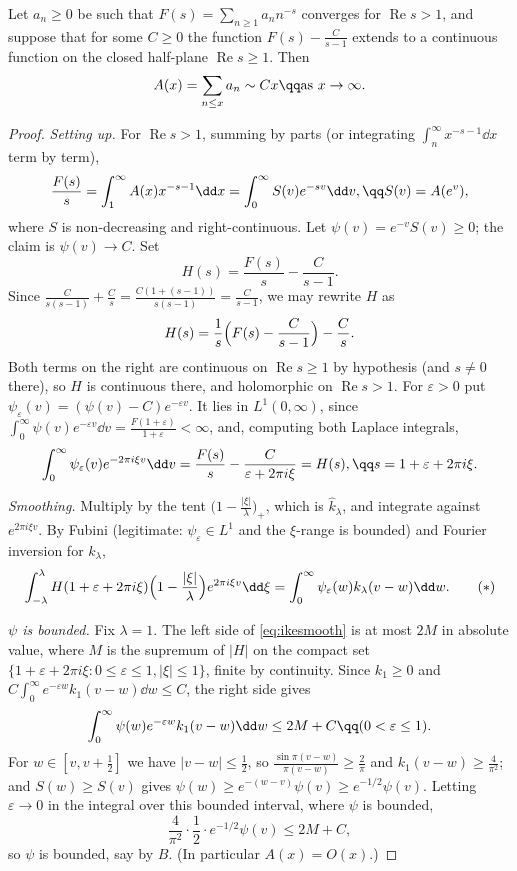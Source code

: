 \begin{theorem}\label{thm:ikehara}
Let $a_n\ge0$ be such that $F(s)=\sum_{n\ge1}a_nn^{-s}$ converges for $\operatorname{Re}s>1$, and suppose that for some $C\ge0$ the function
$F(s)-\frac C{s-1}$ extends to a continuous function on the closed half-plane $\operatorname{Re}s\ge1$. Then
\[
A(x)=\sum_{n\le x}a_n\sim Cx\qq\text{as }x\to\infty.
\]
\end{theorem}
\begin{proof}
\emph{Setting up.} For $\operatorname{Re}s>1$, summing by parts (or integrating $\int_n^\infty x^{-s-1}\dd x$ term by term),
\[
\frac{F(s)}s=\int_1^\infty A(x)x^{-s-1}\dd x=\int_0^\infty S(v)e^{-sv}\dd v,\qq S(v)=A(e^v),
\]
where $S$ is non-decreasing and right-continuous. Let $\psi(v)=e^{-v}S(v)\ge0$; the claim is $\psi(v)\to C$. Set
\[
H(s)=\frac{F(s)}s-\frac C{s-1}.
\]
Since $\frac C{s(s-1)}+\frac Cs=\frac{C(1+(s-1))}{s(s-1)}=\frac C{s-1}$, we may rewrite $H$ as
\[
H(s)=\frac1s\Bigl(F(s)-\frac C{s-1}\Bigr)-\frac Cs.
\]
Both terms on the right are continuous on $\operatorname{Re}s\ge1$ by hypothesis (and $s\ne0$ there), so $H$ is
continuous there, and holomorphic on $\operatorname{Re}s>1$. For $\varepsilon>0$ put $\psi_\varepsilon(v)=(\psi(v)-C)e^{-\varepsilon v}$. It lies in $L^1(0,\infty)$, since
$\int_0^\infty\psi(v)e^{-\varepsilon v}\dd v=\frac{F(1+\varepsilon)}{1+\varepsilon}<\infty$, and, computing both Laplace integrals,
\[
\int_0^\infty\psi_\varepsilon(v)e^{-2\pi i\xi v}\dd v=\frac{F(s)}s-\frac C{\varepsilon+2\pi i\xi}=H(s),\qq s=1+\varepsilon+2\pi i\xi.
\]

\emph{Smoothing.} Multiply by the tent $\bigl(1-\frac{|\xi|}\lambda\bigr)_+$, which is $\hat k_\lambda$, and integrate against $e^{2\pi i\xi v}$. By Fubini
(legitimate: $\psi_\varepsilon\in L^1$ and the $\xi$-range is bounded) and Fourier inversion for $k_\lambda$,
\[
\int_{-\lambda}^\lambda H(1+\varepsilon+2\pi i\xi)\Bigl(1-\frac{|\xi|}\lambda\Bigr)e^{2\pi i\xi v}\dd\xi=\int_0^\infty\psi_\varepsilon(w)k_\lambda(v-w)\dd w.\tag{$*$}\label{eq:ikesmooth}
\]

\emph{$\psi$ is bounded.} Fix $\lambda=1$. The left side of \eqref{eq:ikesmooth} is at most $2M$ in absolute value, where $M$ is the supremum of $|H|$ on the
compact set $\{1+\varepsilon+2\pi i\xi:0\le\varepsilon\le1,|\xi|\le1\}$, finite by continuity. Since $k_1\ge0$ and $C\int_0^\infty e^{-\varepsilon w}k_1(v-w)\dd w\le C$, the right side gives
\[
\int_0^\infty\psi(w)e^{-\varepsilon w}k_1(v-w)\dd w\le2M+C\qq(0<\varepsilon\le1).
\]
For $w\in[v,v+\frac12]$ we have $|v-w|\le\frac12$, so $\frac{\sin\pi(v-w)}{\pi(v-w)}\ge\frac2\pi$ and $k_1(v-w)\ge\frac4{\pi^2}$; and $S(w)\ge S(v)$ gives
$\psi(w)\ge e^{-(w-v)}\psi(v)\ge e^{-1/2}\psi(v)$. Letting $\varepsilon\to0$ in the integral over this bounded interval, where $\psi$ is bounded,
\[
\frac4{\pi^2}\cdot\frac12\cdot e^{-1/2}\psi(v)\le2M+C,
\]
so $\psi$ is bounded, say by $B$. (In particular $A(x)=O(x)$.)


\end{proof}

